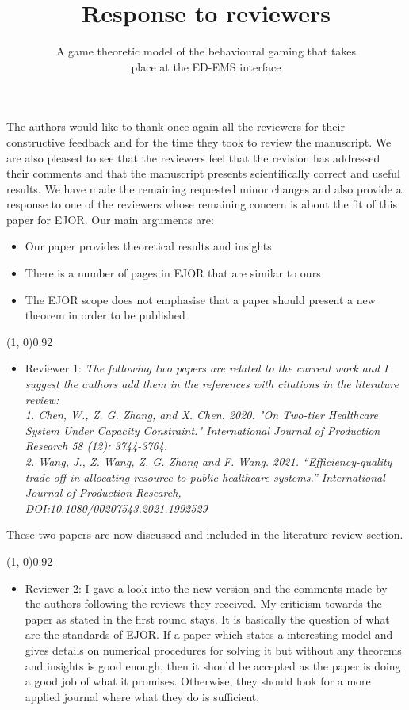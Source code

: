\documentclass{article}
\title{Response to reviewers}
\author{A game theoretic model of the behavioural gaming that takes \\
place at the ED-EMS interface}
\begin{document}
    \maketitle

    The authors would like to thank once again all the reviewers for their
    constructive feedback and for
    the time they took to review the manuscript.
    We are also pleased to see that the reviewers feel that the revision has
    addressed their comments and that the manuscript presents scientifically
    correct and useful results.
    We have made the remaining requested minor changes and also provide a
    response to one of the reviewers whose remaining concern is about the fit
    of this paper for EJOR.
    Our main arguments are:
    \begin{itemize}
        \item Our paper provides theoretical results and insights
        \item There is a number of pages in EJOR that are similar to ours
        \item The EJOR scope does not emphasise that a paper should present a
        new theorem in order to be published
    \end{itemize}


    \line(1, 0){0.92\textwidth}
    \begin{itemize}
        \item Reviewer 1: \textit{The following two papers are related to the
        current work and I suggest the authors add them in the references with
        citations in the literature review: \\
        1. Chen, W., Z. G. Zhang, and X. Chen. 2020. "On Two-tier Healthcare
        System Under Capacity Constraint." International Journal of Production
        Research 58 (12): 3744-3764. \\
        2. Wang, J., Z. Wang, Z. G. Zhang and F. Wang. 2021.
        ``Efficiency-quality trade-off in allocating resource to public
        healthcare systems.'' International Journal of Production Research, \\
        DOI:10.1080/00207543.2021.1992529}
    \end{itemize}

    These two papers are now discussed and included in the literature review
    section.

    \line(1, 0){0.92\textwidth}
    \begin{itemize}
        \item Reviewer 2: I gave a look into the new version and the comments
        made by the authors following the reviews they received.
        My criticism towards the paper as stated in the first round stays.
        It is basically the question of what are the standards of EJOR.
        If a paper which states a interesting model and gives details on
        numerical procedures for solving it but without any theorems and
        insights is good enough, then it should be accepted as the paper is
        doing a good job of what it promises.
        Otherwise, they should look for a more applied journal where what they
        do is sufficient.
    \end{itemize}
\end{document}
